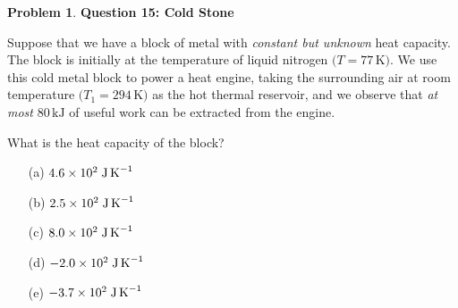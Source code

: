 \documentclass[10pt]{article}
\theoremstyle{definition} %
\newtheorem{problem}{Problem}
\theoremstyle{plain} %
\begin{document}
          \begin{problem}
            \textbf{Question 15: Cold Stone}
            
            Suppose that we have a block of metal with \emph{constant but unknown} heat
            capacity.  
            The block is initially at the temperature of liquid nitrogen
            \(\bigl(T = 77\,\text{K}\bigr)\).
            We use this cold metal block to power a heat engine, taking the surrounding
            air at room temperature \(\bigl(T_{1}=294\,\text{K}\bigr)\) as the hot thermal
            reservoir, and we observe that \emph{at most}
            \(80\,\text{kJ}\) of useful work can be extracted from the engine.
            
            \medskip
            What is the heat capacity of the block?
            
            \begin{enumerate}
              \item[(a)] \(4.6\times10^{2}\;\text{J\,K}^{-1}\)
              \item[(b)] \(2.5\times10^{2}\;\text{J\,K}^{-1}\)
              \item[(c)] \(8.0\times10^{2}\;\text{J\,K}^{-1}\)
              \item[(d)] \(-2.0\times10^{2}\;\text{J\,K}^{-1}\)
              \item[(e)] \(-3.7\times10^{2}\;\text{J\,K}^{-1}\)
            \end{enumerate}
            \end{problem}
\end{document}
